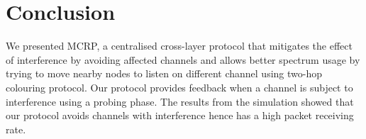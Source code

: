 \section{Conclusion}
\label{sec:conclusion}


We presented MCRP, a centralised cross-layer protocol that mitigates the effect of interference by avoiding affected channels and allows better spectrum usage by trying to move nearby nodes to listen on different channel using two-hop colouring protocol. Our protocol provides feedback when a channel is subject to interference using a probing phase.
The results from the simulation showed that our protocol avoids channels with interference hence has a high packet receiving rate.




